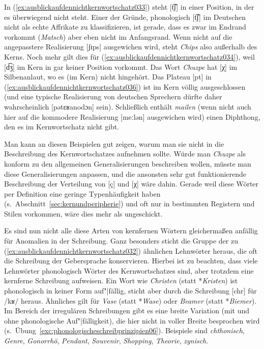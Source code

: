 In (\ref{ex:ausblickaufdennichtkernwortschatz033}) steht [t͡ʃ] in einer Position, in der es überwiegend nicht steht.
Einer der Gründe, phonologisch [t͡ʃ] im Deutschen nicht als echte Affrikate zu klassifizieren, ist gerade, dass es zwar im Endrand vorkommt (\textit{Matsch}) aber eben nicht im Anfangsrand.
Wenn nicht auf die angepasstere Realisierung [ʃɪps] ausgewichen wird, steht \textit{Chips} also außerhalb des Kerns.
Noch mehr gilt dies für (\ref{ex:ausblickaufdennichtkernwortschatz034}), weil [d͡ʒ] im Kern in gar keiner Position vorkommt.
Das Wort \textit{Chuzpe} hat [χ] im Silbenanlaut, wo es (im Kern) nicht hingehört.
Das Plateau [pt] in (\ref{ex:ausblickaufdennichtkernwortschatz036}) ist im Kern völlig ausgeschlossen (und eine typische Realisierung von deutschen Sprechern dürfte daher wahrscheinlich [pətɛʁanodɔn] sein).
Schließlich enthält \textit{mailen} (wenn nicht auch hier auf die kommodere Realisierung [meːlən] ausgewichen wird) einen Diphthong, den es im Kernwortschatz nicht gibt.

Man kann an diesen Beispielen gut zeigen, warum man sie nicht in die Beschreibung des Kernwortschatzes aufnehmen sollte.
Würde man \textit{Chuzpe} \zB als konform zu den allgemeinen Generalisierungen beschreiben wollen, müsste man diese Generalisierungen anpassen, und die ansonsten sehr gut funktionierende Beschreibung der Verteilung von [ç] und [χ] wäre dahin.
Gerade weil diese Wörter per Definition eine geringe Typenhäufigkeit haben (s.\ Abschnitt~\ref{sec:kernundperipherie}) und oft nur in bestimmten Registern und Stilen vorkommen, wäre dies mehr als ungeschickt.

Es sind nun nicht alle diese Arten von kernfernen Wörtern gleichermaßen anfällig für Anomalien in der Schreibung.
Ganz besonders sticht die Gruppe der zu (\ref{ex:ausblickaufdennichtkernwortschatz032}) ähnlichen Lehnwörter heraus, die oft die Schreibung der Gebersprache konservieren.
Hierbei ist zu beachten, dass viele Lehnwörter phonologisch Wörter des Kernwortschatzes sind, aber trotzdem eine kernferne Schreibung aufweisen.
Ein Wort wie \textit{Christen} (statt *\textit{Kristen}) ist phonologisch in keiner Form auf"|fällig, sticht aber durch die Schreibung [chr] für /kʁ/ heraus.
Ähnliches gilt für \textit{Vase} (statt *\textit{Wase}) oder \textit{Beamer} (statt *\textit{Biemer}).
Im Bereich der irregulären Schreibungen gibt es eine breite Variation (mit und ohne phonologische Auf"|fälligkeit), die hier nicht in voller Breite besprochen wird (s.\ Übung~\ref{exc:phonologischeschreibprinzipien06}).
Beispiele sind \textit{chthonisch}, \textit{Genre}, \textit{Gonorrhö}, \textit{Pendant}, \textit{Souvenir}, \textit{Shopping}, \textit{Theorie}, \textit{zynisch}.


